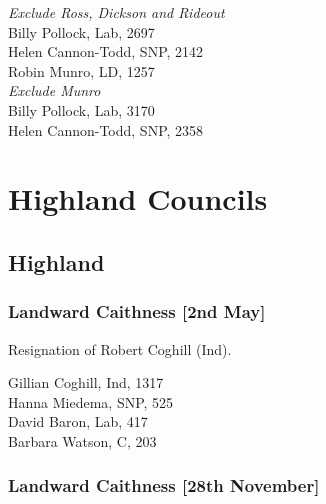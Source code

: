 \documentclass[a4paper,openany,10pt]{book}
\begin{document}
\emph{Exclude Ross, Dickson and Rideout}\\
Billy Pollock, Lab, 2697\\
Helen Cannon-Todd, SNP, 2142\\
Robin Munro, LD, 1257\\




\emph{Exclude Munro}\\
Billy Pollock, Lab, 3170\\
Helen Cannon-Todd, SNP, 2358\\


\vfill

\section[Highland Councils]{{Highland Councils}}

\subsection*{Highland}

\subsubsection*{Landward Caithness \hspace*{\fill}\nolinebreak[1]%
\enspace\hspace*{\fill}
[2nd May]}


Resignation of Robert Coghill (Ind).



Gillian Coghill, Ind, 1317\\
Hanna Miedema, SNP, 525\\
David Baron, Lab, 417\\
Barbara Watson, C, 203\\


\subsubsection*{Landward Caithness \hspace*{\fill}\nolinebreak[1]%
\enspace\hspace*{\fill}
[28th November]}

\end{document}
